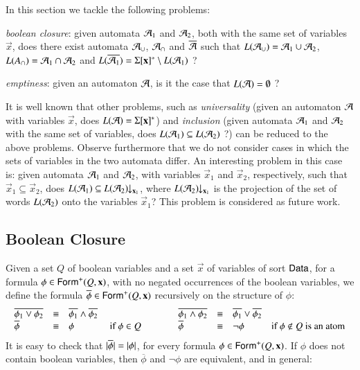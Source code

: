 \documentclass{llncs}
\begin{document}
In this section we tackle the following problems: \begin{compactitem}
\item \emph{boolean closure}: given automata $\mathcal{A}_1$ and $\mathcal{A}_2$, both
  with the same set of variables $\vec{x}$, does there exist automata
  $\mathcal{A}_\cup$, $\mathcal{A}_\cap$ and $\overline{\mathcal{A}}$ such that $L(\mathcal{A}_\cup) =
  \mathcal{A}_1 \cup \mathcal{A}_2$, $L(A_\cap) = \mathcal{A}_1 \cap \mathcal{A}_2$ and $L(\overline{\mathcal{A}_1})
  = \Sigma[\mathbf x]^* \setminus L(\mathcal{A}_1)$ ?
%
\item \emph{emptiness}: given an automaton $\mathcal{A}$, is it the case that
  $L(\mathcal{A}) = \emptyset$ ?
\end{compactitem}

It is well known that other problems, such as \emph{universality}
(given an automaton $\mathcal{A}$ with variables $\vec{x}$, does $L(\mathcal{A}) =
\Sigma[\mathbf x]^*$) and \emph{inclusion} (given automata $\mathcal{A}_1$ and
$\mathcal{A}_2$ with the same set of variables, does $L(\mathcal{A}_1) \subseteq
L(\mathcal{A}_2)$ ?) can be reduced to the above problems. Observe furthermore
that we do not consider cases in which the sets of variables in the
two automata differ. An interesting problem in this case is: given
automata $\mathcal{A}_1$ and $\mathcal{A}_2$, with variables $\vec{x}_1$ and
$\vec{x}_2$, respectively, such that $\vec{x}_1 \subseteq \vec{x}_2$,
does $L(\mathcal{A}_1) \subseteq {L(\mathcal{A}_2)}\!\!\downarrow_{{\mathbf x_1}}$, where
${L(\mathcal{A}_2)}\!\!\downarrow_{{\mathbf x_1}}$ is the projection of the set of words
$L(\mathcal{A}_2)$ onto the variables $\vec{x}_1$? This problem is considered
as future work.

\subsection{Boolean Closure}

Given a set $Q$ of boolean variables and a set $\vec{x}$ of variables
of sort $\mathsf{Data}$, for a formula $\phi \in \mathsf{Form}^+(Q,\mathbf x)$, with no
negated occurrences of the boolean variables, we define the formula
$\overline{\phi} \in \mathsf{Form}^+(Q,\mathbf x)$ recursively on the structure
of $\phi$:
\[\begin{array}{lclclclc}
\overline{\phi_1 \vee \phi_2} & \equiv & \overline{\phi_1} \wedge \overline{\phi_2} && 
\overline{\phi_1 \wedge \phi_2} & \equiv & \overline{\phi_1} \vee \overline{\phi_2} \\
\overline{\phi} & \equiv & \phi & \text{ if $\phi \in Q$}\hspace*{1cm} &
\overline{\phi} & \equiv & \neg\phi & \text{if $\phi \not\in Q$ is an atom}
\end{array}\]
It is easy to check that ${|{\overline{\phi}}|} = {|{\phi}|}$, for
every formula $\phi \in \mathsf{Form}^+(Q,\mathbf x)$. If $\phi$ does not
contain boolean variables, then $\overline{\phi}$ and $\neg\phi$ are
equivalent, and in general:
\end{document}

